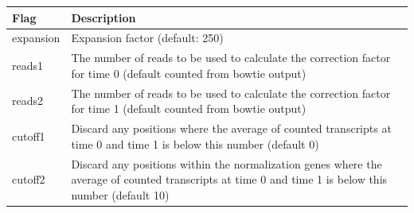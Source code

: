 \documentclass[11pt,]{article}
\begin{document}
\begin{longtable}[]{@{}ll@{}}
\toprule
\begin{minipage}[b]{0.08\columnwidth}\raggedright\strut
Flag\strut
\end{minipage} & \begin{minipage}[b]{0.86\columnwidth}\raggedright\strut
Description\strut
\end{minipage}\tabularnewline
\midrule
\endhead
\begin{minipage}[t]{0.08\columnwidth}\raggedright\strut
expansion\strut
\end{minipage} & \begin{minipage}[t]{0.86\columnwidth}\raggedright\strut
Expansion factor (default: 250)\strut
\end{minipage}\tabularnewline
\begin{minipage}[t]{0.08\columnwidth}\raggedright\strut
reads1\strut
\end{minipage} & \begin{minipage}[t]{0.86\columnwidth}\raggedright\strut
The number of reads to be used to calculate the correction factor for
time 0 (default counted from bowtie output)\strut
\end{minipage}\tabularnewline
\begin{minipage}[t]{0.08\columnwidth}\raggedright\strut
reads2\strut
\end{minipage} & \begin{minipage}[t]{0.86\columnwidth}\raggedright\strut
The number of reads to be used to calculate the correction factor for
time 1 (default counted from bowtie output)\strut
\end{minipage}\tabularnewline
\begin{minipage}[t]{0.08\columnwidth}\raggedright\strut
cutoff1\strut
\end{minipage} & \begin{minipage}[t]{0.86\columnwidth}\raggedright\strut
Discard any positions where the average of counted transcripts at time 0
and time 1 is below this number (default 0)\strut
\end{minipage}\tabularnewline
\begin{minipage}[t]{0.08\columnwidth}\raggedright\strut
cutoff2\strut
\end{minipage} & \begin{minipage}[t]{0.86\columnwidth}\raggedright\strut
Discard any positions within the normalization genes where the average
of counted transcripts at time 0 and time 1 is below this number
(default 10)\strut
\end{minipage}\tabularnewline

\end{longtable}
\end{document}
